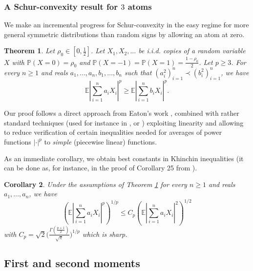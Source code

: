 \documentclass[10pt]{article}
\newcommand{\E}{\mathbb{E}}
\newcommand{\1}{\textbf{1}}
\newcommand{\p}[1]{\mathbb{P}\left( #1 \right)}
\newtheorem{theorem}{Theorem}
\newtheorem{corollary}[theorem]{Corollary}
\theoremstyle{remark}
\theoremstyle{definition}
\begin{document}
\subsubsection{A Schur-convexity result for $3$ atoms}

We make an incremental progress for Schur-convexity in the easy regime for more general symmetric distributions than random signs by allowing an atom at zero. 


\begin{theorem}\label{thm:Schur}
Let $\rho_0 \in [0,\frac{1}{2}]$. Let $X_1,X_2,\ldots$ be i.i.d. copies of a random variable $X$ with $\p{X = 0} = \rho_0$ and $\p{X = -1} = \p{X = 1} = \frac{1-\rho_0}{2}$. Let $p \geq 3$. For every $n \geq 1$ and reals $a_1,\ldots,a_n, b_1, \ldots, b_n$ such that $(a_i^2)_{i=1}^n \prec (b_i^2)_{i=1}^n$, we have
\begin{equation}\label{eq:Schur}
\E\left|\sum_{i=1}^n a_iX_i \right|^p \geq \E\left|\sum_{i=1}^n b_iX_i \right|^p.
\end{equation}
\end{theorem}

Our proof follows a direct approach from Eaton's work \cite{Eat}, combined with rather standard techniques (used for instance in \cite{FHJSZ}, or \cite{ENT2}) exploiting linearity and allowing to reduce verification of certain inequalities needed for averages of power functions $|\cdot|^p$ to \emph{simple} (piecewise linear) functions. 

As an immediate corollary, we obtain best constants in Khinchin inequalities (it can be done as, for instance, in the proof of Corollary 25 from \cite{ENT1}).

\begin{corollary}
Under the assumptions of Theorem \ref{thm:Schur} for every $n \geq 1$ and reals $a_1,\ldots,a_n$, we have
\begin{equation}\label{eq:2-p>3'}
\left(\E\left|\sum_{i=1}^n a_iX_i \right|^p\right)^{1/p} \leq C_p \left(\E\left|\sum_{i=1}^n a_iX_i \right|^2\right)^{1/2} 
\end{equation}
with $C_p = \sqrt{2} \Big(\frac{\Gamma (\frac{p+1}{2})}{\sqrt{\pi}} \Big)^{1/p}$ which is sharp.
\end{corollary}



\subsection{First and second moments}
\end{document}
